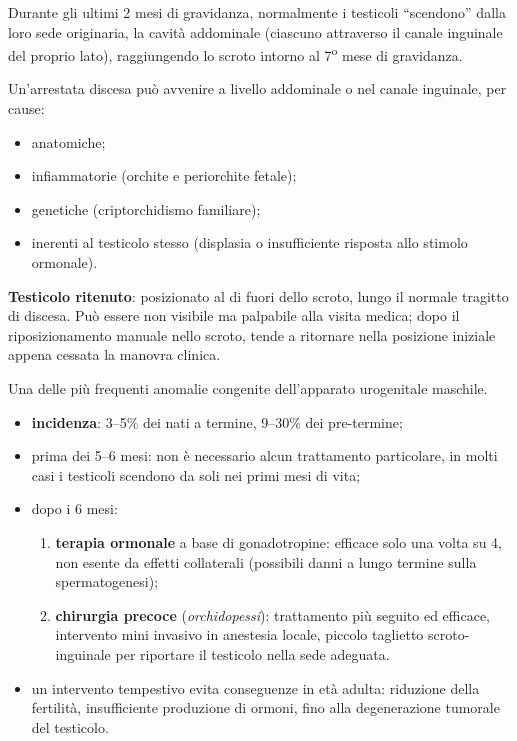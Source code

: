 Durante gli ultimi 2 mesi di gravidanza, normalmente i testicoli ``scendono'' dalla loro sede
originaria, la cavità addominale (ciascuno attraverso il canale inguinale del proprio lato),
raggiungendo lo scroto intorno al 7\textsuperscript{o} mese di gravidanza.

Un'arrestata discesa può avvenire a livello addominale o nel canale inguinale, per cause:
\begin{itemize}
  \item anatomiche;
  \item infiammatorie (orchite e periorchite fetale);
  \item genetiche (criptorchidismo familiare);
  \item inerenti al testicolo stesso (displasia o insufficiente risposta allo stimolo ormonale).
\end{itemize}

\textbf{Testicolo ritenuto}: posizionato al di fuori dello scroto, lungo il normale tragitto di
discesa. Può essere non visibile ma palpabile alla visita medica; dopo il riposizionamento manuale
nello scroto, tende a ritornare nella posizione iniziale appena cessata la manovra clinica.

Una delle più frequenti anomalie congenite dell'apparato urogenitale maschile.
\begin{itemize}
  \item \textbf{incidenza}: 3--5\% dei nati a termine, 9--30\% dei pre-termine;
  \item prima dei 5--6 mesi: non è necessario alcun trattamento particolare, in molti casi i
    testicoli scendono da soli nei primi mesi di vita;
  \item dopo i 6 mesi:
  \begin{enumerate}
    \item \textbf{terapia ormonale} a base di gonadotropine: efficace solo una volta su 4, non
      esente da effetti collaterali (possibili danni a lungo termine sulla spermatogenesi);
    \item \textbf{chirurgia precoce} (\textit{orchidopessi}): trattamento più seguito ed efficace,
      intervento mini invasivo in anestesia locale, piccolo taglietto scroto-inguinale per
      riportare il testicolo nella sede adeguata.
  \end{enumerate}
  \item un intervento tempestivo evita conseguenze in età adulta: riduzione della fertilità,
    insufficiente produzione di ormoni, fino alla degenerazione tumorale del testicolo.
\end{itemize}

